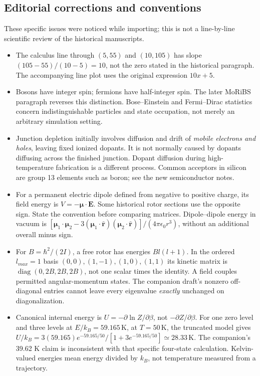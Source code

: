 \subsection{Editorial corrections and conventions}
These specific issues were noticed while importing; this is not a line-by-line scientific review of the historical manuscripts.
\begin{itemize}
\item The calculus line through $(5,55)$ and $(10,105)$ has slope $(105-55)/(10-5)=10$, not the zero stated in the historical paragraph. The accompanying line plot uses the original expression $10x+5$.
\item Bosons have integer spin; fermions have half-integer spin. The later MoRiBS paragraph reverses this distinction. Bose--Einstein and Fermi--Dirac statistics concern indistinguishable particles and state occupation, not merely an arbitrary simulation setting.
\item Junction depletion initially involves diffusion and drift of \emph{mobile electrons and holes}, leaving fixed ionized dopants. It is not normally caused by dopants diffusing across the finished junction. Dopant diffusion during high-temperature fabrication is a different process. Common acceptors in silicon are group 13 elements such as boron; see the new semiconductor notes.
\item For a permanent electric dipole defined from negative to positive charge, its field energy is $V=-\boldsymbol\mu\cdot\mathbf E$. Some historical rotor sections use the opposite sign. State the convention before comparing matrices. Dipole--dipole energy in vacuum is $[\boldsymbol\mu_1\cdot\boldsymbol\mu_2-3(\boldsymbol\mu_1\cdot\hat{\mathbf r})(\boldsymbol\mu_2\cdot\hat{\mathbf r})]/(4\pi\epsilon_0r^3)$, without an additional overall minus sign.
\item For $B=\hbar^2/(2I)$, a free rotor has energies $Bl(l+1)$. In the ordered $l_{max}=1$ basis $(0,0),(1,-1),(1,0),(1,1)$ its kinetic matrix is $\operatorname{diag}(0,2B,2B,2B)$, not one scalar times the identity. A field couples permitted angular-momentum states. The companion draft's nonzero off-diagonal entries cannot leave every eigenvalue \emph{exactly} unchanged on diagonalization.
\item Canonical internal energy is $U=-\partial\ln Z/\partial\beta$, not $-\partial Z/\partial\beta$. For one zero level and three levels at $E/k_B=59.165\,\mathrm K$, at $T=50\,\mathrm K$, the truncated model gives $U/k_B=3(59.165)e^{-59.165/50}/[1+3e^{-59.165/50}]\simeq28.33\,\mathrm K$. The companion's 39.62 K claim is inconsistent with that specific four-state calculation. Kelvin-valued energies mean energy divided by $k_B$, not temperature measured from a trajectory.

\end{itemize}
